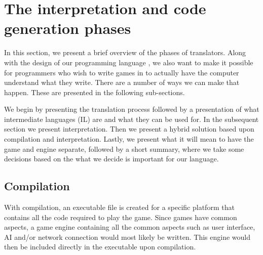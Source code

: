 \section{The interpretation and code generation phases}
\label{sec:codegenerationandinterpretation}

In this section, we present a brief overview of the phases of
translators. Along with the design of our programming language
\productname{}, we also want to make it possible for programmers who
wish to write games in \productname{} to actually have the computer
understand what they write. There are a number of ways we can make that
happen. These are presented in the following sub-sections.

We begin by presenting the translation process followed by a
presentation of what intermediate languages (IL) are and what they can
be used for. In the subsequent section we present interpretation. Then
we present a hybrid solution based upon compilation and interpretation.
Lastly, we present what it will mean to have the game and engine
separate, followed by a short summary, where we take some decisions
based on the what we decide is important for our language.



\subsection{Compilation}
\label{sec:compilation}
With compilation, an executable file is created for a specific platform
that contains all the code required to play the game. Since games have
common aspects, a game engine containing all the common aspects such
as user interface, AI and/or network connection would most likely be
written. This engine would then be included directly in the executable
upon compilation.

